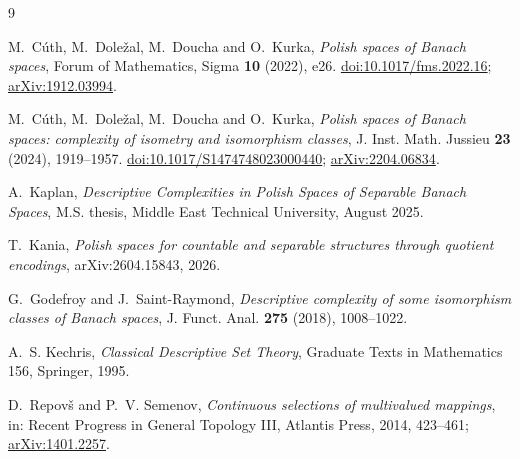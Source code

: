 \documentclass[11pt]{article}
\theoremstyle{definition}
\begin{document}
\begin{thebibliography}{9}

M.~C\'uth, M.~Dole\v{z}al, M.~Doucha and O.~Kurka,
\emph{Polish spaces of Banach spaces},
Forum of Mathematics, Sigma \textbf{10} (2022), e26.
\href{https://doi.org/10.1017/fms.2022.16}{doi:10.1017/fms.2022.16};
\href{https://arxiv.org/abs/1912.03994}{arXiv:1912.03994}.

M.~C\'uth, M.~Dole\v{z}al, M.~Doucha and O.~Kurka,
\emph{Polish spaces of Banach spaces: complexity of isometry and isomorphism
classes},
J. Inst. Math. Jussieu \textbf{23} (2024), 1919--1957.
\href{https://doi.org/10.1017/S1474748023000440}{doi:10.1017/S1474748023000440};
\href{https://arxiv.org/abs/2204.06834}{arXiv:2204.06834}.

A.~Kaplan,
\emph{Descriptive Complexities in Polish Spaces of Separable Banach Spaces},
M.S. thesis, Middle East Technical University, August 2025.

T.~Kania,
\emph{Polish spaces for countable and separable structures through quotient
encodings},
arXiv:2604.15843, 2026.

G.~Godefroy and J.~Saint-Raymond,
\emph{Descriptive complexity of some isomorphism classes of Banach spaces},
J. Funct. Anal. \textbf{275} (2018), 1008--1022.

A.~S. Kechris,
\emph{Classical Descriptive Set Theory},
Graduate Texts in Mathematics 156, Springer, 1995.

D.~Repov\v{s} and P.~V. Semenov,
\emph{Continuous selections of multivalued mappings},
in: Recent Progress in General Topology III, Atlantis Press, 2014, 423--461;
\href{https://arxiv.org/abs/1401.2257}{arXiv:1401.2257}.

\end{thebibliography}
\end{document}
